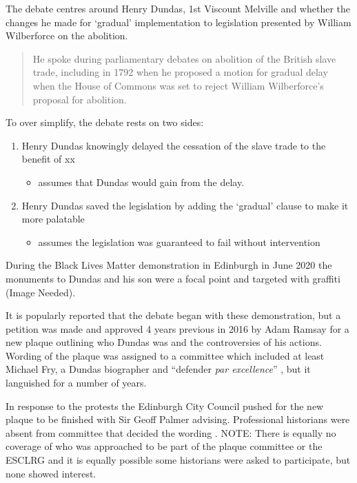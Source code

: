 \documentclass{scrartcl}
\begin{document}
The debate centres around Henry Dundas, 1st Viscount Melville and whether the changes he made for `gradual' implementation to legislation presented by William Wilberforce on the abolition.

\begin{quotation}
    He spoke during parliamentary debates on abolition of the British slave trade, including in 1792 when he proposed a motion for gradual delay when the House of Commons was set to reject William Wilberforce’s proposal for abolition. 
\end{quotation}
\cite{mullen_2021}

To over simplify, the debate rests on two sides:

\begin{enumerate}
    \item Henry Dundas knowingly delayed the cessation of the slave trade to the benefit of xx
    \begin{itemize}
        \item assumes that Dundas would gain from the delay.
    \end{itemize}
    \item Henry Dundas saved the legislation by adding the `gradual' clause to make it more palatable 
    \begin{itemize}
        \item assumes the legislation was guaranteed to fail without intervention
    \end{itemize}
\end{enumerate}

During the Black Lives Matter demonstration in Edinburgh in June 2020 the monuments to Dundas and his son were a focal point and targeted with graffiti (Image Needed). 

It is popularly reported that the debate began with these demonstration, but a petition was made and approved 4 years previous in 2016 by Adam Ramsay \cite{mullen_2021} for a new plaque outlining who Dundas was and the controversies of his actions. Wording of the plaque was assigned to a committee which included at least Michael Fry, a Dundas biographer and ``defender \textit{par excellence}'' \cite{mccarthy_2022_1}, but it languished for a number of years.

In response to the protests the Edinburgh City Council pushed for the new plaque to be finished with Sir Geoff Palmer advising. Professional historians were absent from committee that decided the wording \cite{scotsman_2022}. NOTE: There is equally no coverage of who was approached to be part of the plaque committee or the ESCLRG and it is equally possible some historians were asked to participate, but none showed interest.
\end{document}
